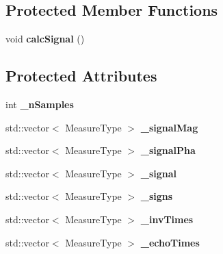 \subsection*{Protected Member Functions}
\begin{DoxyCompactItemize}
\item 
void {\bfseries calc\+Signal} ()\hypertarget{class_ox_1_1_test_data_a014e56191a98df90450c0b6fa2abc45d}{}\label{class_ox_1_1_test_data_a014e56191a98df90450c0b6fa2abc45d}

\end{DoxyCompactItemize}
\subsection*{Protected Attributes}
\begin{DoxyCompactItemize}
\item 
int {\bfseries \+\_\+n\+Samples}\hypertarget{class_ox_1_1_test_data_a41f65fef5fa534f713cb8a229e5ae14d}{}\label{class_ox_1_1_test_data_a41f65fef5fa534f713cb8a229e5ae14d}

\item 
std\+::vector$<$ Measure\+Type $>$ {\bfseries \+\_\+signal\+Mag}\hypertarget{class_ox_1_1_test_data_a180e0158dc204212fd4879690b2ea3ad}{}\label{class_ox_1_1_test_data_a180e0158dc204212fd4879690b2ea3ad}

\item 
std\+::vector$<$ Measure\+Type $>$ {\bfseries \+\_\+signal\+Pha}\hypertarget{class_ox_1_1_test_data_a5012bab7b7943d05b33151aae38efcc1}{}\label{class_ox_1_1_test_data_a5012bab7b7943d05b33151aae38efcc1}

\item 
std\+::vector$<$ Measure\+Type $>$ {\bfseries \+\_\+signal}\hypertarget{class_ox_1_1_test_data_a3d844b169fbdbfcb77d5ef0bf527f554}{}\label{class_ox_1_1_test_data_a3d844b169fbdbfcb77d5ef0bf527f554}

\item 
std\+::vector$<$ Measure\+Type $>$ {\bfseries \+\_\+signs}\hypertarget{class_ox_1_1_test_data_a9e22c4f291064b0c49f7c8007e77b40a}{}\label{class_ox_1_1_test_data_a9e22c4f291064b0c49f7c8007e77b40a}

\item 
std\+::vector$<$ Measure\+Type $>$ {\bfseries \+\_\+inv\+Times}\hypertarget{class_ox_1_1_test_data_a4a72325aa7d38c4cac1762a47b7eed1a}{}\label{class_ox_1_1_test_data_a4a72325aa7d38c4cac1762a47b7eed1a}

\item 
std\+::vector$<$ Measure\+Type $>$ {\bfseries \+\_\+echo\+Times}\hypertarget{class_ox_1_1_test_data_aaffd834afe5a5ceb48eb84a9268d0d68}{}\label{class_ox_1_1_test_data_aaffd834afe5a5ceb48eb84a9268d0d68}


\end{DoxyCompactItemize}
